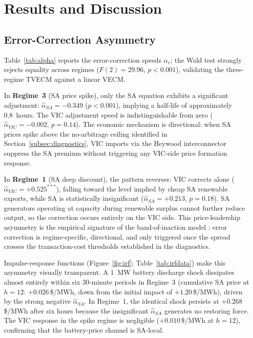 \documentclass[12pt,a4paper]{article}
\begin{document}
\section{Results and Discussion}
\label{sec:results}

\subsection{Error-Correction Asymmetry}
\label{subsec:eca}

Table~\ref{tab:alpha} reports the error-correction speeds $\alpha_r$; the Wald
test strongly rejects equality across regimes ($F(2) = 29.96$, $p < 0.001$),
validating the three-regime TVECM against a linear VECM.

In \textbf{Regime~3} (SA price spike), only the SA equation exhibits a
significant adjustment: $\hat\alpha_{SA} = -0.349$ ($p < 0.001$), implying a
half-life of approximately 0.8~hours.  The VIC adjustment speed is
indistinguishable from zero ($\hat\alpha_{VIC} = -0.002$, $p = 0.14$).  The
economic mechanism is directional: when SA prices spike above the no-arbitrage
ceiling identified in Section~\ref{subsec:diagnostics}, VIC imports via the
Heywood interconnector suppress the SA premium without triggering any
VIC-side price formation response.

In \textbf{Regime~1} (SA deep discount), the pattern reverses: VIC corrects
alone ($\hat\alpha_{VIC} = +0.525^{***}$), falling toward the level implied by
cheap SA renewable exports, while SA is statistically insignificant
($\hat\alpha_{SA} = +0.213$, $p = 0.18$).  SA generators operating at capacity
during renewable surplus cannot further reduce output, so the correction occurs
entirely on the VIC side.  This price-leadership asymmetry is the empirical
signature of the band-of-inaction model \parencite{balke1997threshold}: error
correction is regime-specific, directional, and only triggered once the spread
crosses the transaction-cost thresholds established in the diagnostics.

Impulse-response functions (Figure~\ref{fig:irf}; Table~\ref{tab:irfdata}) make
this asymmetry visually transparent.  A 1~MW battery discharge shock dissipates
almost entirely within six 30-minute periods in Regime~3 (cumulative SA price at
$h = 12$: $+0.026$\,\$/MWh, down from the initial impact of $+1.20$\,\$/MWh),
driven by the strong negative $\hat\alpha_{SA}$.  In Regime~1, the identical
shock persists at $+0.268$\,\$/MWh after six hours because the insignificant
$\hat\alpha_{SA}$ generates no restoring force.  The VIC response in the spike
regime is negligible ($+0.010$\,\$/MWh at $h = 12$), confirming that the
battery-price channel is SA-local.
\end{document}
